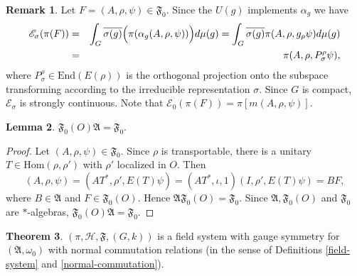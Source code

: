 \documentclass[11pt]{article}
\newcommand{\alg}[1]{\mathfrak{#1}}
\theoremstyle{definition}
\newtheorem{thm}{Theorem}[section]
\newtheorem{lemma}[thm]{Lemma}
\theoremstyle{definition}
\newtheorem{note}[thm]{Remark}
\theoremstyle{remark}
\def\2#1{{\mathcal #1}}
\def\4#1{{\mathscr #1}}
\def\a{\alpha} \def\b{\beta} \def\g{\gamma} \def\d{\delta}
\def\om{\omega} \def\Om{\Omega} \def\dd{\partial} \def\D{\Delta}
\newcommand{\Hom}{\mathrm{Hom}}
\newcommand{\End}{\mathrm{End}}
\newcommand{\fields}{(\pi ,\2H ,\alg{F},(G,k))}
\begin{document}
\begin{note} Let $F=(A,\rho ,\psi )\in \alg{F}_0$.  Since the $U(g)$ implements $\a
  _g$ we have
  \begin{eqnarray} \4E _{\sigma}(\pi (F)) &=& \int _{G} \overline{\sigma (g)}\Bigl(
    \pi (\a _g(A, \rho ,\psi ))\Bigr)d\mu (g) = \int _G \overline{\sigma (g)}\pi
    (A,\rho ,g_\rho \psi )d\mu (g) \nonumber \\ &=& \pi (A,\rho
    ,P^{\rho}_{\sigma}\psi ) ,\label{eqn-projection} \end{eqnarray} where
  $P_{\sigma}^{\rho}\in \End (E(\rho ))$ is the orthogonal projection onto the
  subspace transforming according to the irreducible representation $\sigma$.  Since
  $G$ is compact, $\4E _\sigma$ is strongly continuous. Note that $\4E _{0}(\pi
  (F))=\pi [m(A,\rho ,\psi )]$. \end{note}

\begin{lemma} $\alg{F}_0(O)\alg{A}=\alg{F}_0$. \label{cyclic} \end{lemma}

  \begin{proof} Let $(A,\rho ,\psi )\in \alg{F}_0$.  Since $\rho$ is transportable,
    there is a unitary $T\in \Hom (\rho ,\rho ')$ with $\rho '$ localized in $O$.
    Then
$$ (A,\rho ,\psi )=(AT^*,\rho ',E(T)\psi )=(AT^*,\iota ,1)(I,\rho ',E(T)\psi )=BF ,$$
where $B\in \alg{A}$ and $F\in \alg{F}_0(O)$. Hence $\alg{A}\alg{F}_0(O)=\alg{F}_0$.
Since $\alg{A},\alg{F}_0(O)$ and $\alg{F}_0$ are $*$-algebras,
$\alg{F}_0(O)\alg{A}=\alg{F}_0$.  \end{proof}


\begin{thm} $\fields$ is a field system with gauge
  symmetry for $(\alg{A},\om _0)$ with normal
  commutation relations (in the sense of Definitions
  \ref{field-system} and
  \ref{normal-commutation}). \end{thm}
\end{document}
